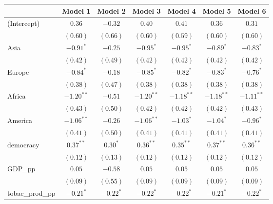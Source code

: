 
\begin{table}[!h]
\begin{center}
\begin{tabular}{l c c c c c c }
\toprule
 & Model 1 & Model 2 & Model 3 & Model 4 & Model 5 & Model 6 \\
\midrule
(Intercept)             & $0.36$       & $-0.32$      & $0.40$       & $0.41$       & $0.36$       & $0.31$       \\
                        & $(0.60)$     & $(0.66)$     & $(0.60)$     & $(0.59)$     & $(0.60)$     & $(0.60)$     \\
Asia                    & $-0.91^{*}$  & $-0.25$      & $-0.95^{*}$  & $-0.95^{*}$  & $-0.89^{*}$  & $-0.83^{*}$  \\
                        & $(0.42)$     & $(0.49)$     & $(0.42)$     & $(0.42)$     & $(0.42)$     & $(0.42)$     \\
Europe                  & $-0.84^{*}$  & $-0.18$      & $-0.85^{*}$  & $-0.82^{*}$  & $-0.83^{*}$  & $-0.76^{*}$  \\
                        & $(0.38)$     & $(0.47)$     & $(0.38)$     & $(0.38)$     & $(0.38)$     & $(0.38)$     \\
Africa                  & $-1.20^{**}$ & $-0.51$      & $-1.20^{**}$ & $-1.18^{**}$ & $-1.18^{**}$ & $-1.11^{**}$ \\
                        & $(0.43)$     & $(0.50)$     & $(0.42)$     & $(0.42)$     & $(0.42)$     & $(0.43)$     \\
America                 & $-1.06^{**}$ & $-0.26$      & $-1.06^{**}$ & $-1.03^{*}$  & $-1.04^{*}$  & $-0.96^{*}$  \\
                        & $(0.41)$     & $(0.50)$     & $(0.41)$     & $(0.41)$     & $(0.41)$     & $(0.41)$     \\
democracy               & $0.37^{**}$  & $0.30^{*}$   & $0.36^{**}$  & $0.35^{**}$  & $0.37^{**}$  & $0.36^{**}$  \\
                        & $(0.12)$     & $(0.13)$     & $(0.12)$     & $(0.12)$     & $(0.12)$     & $(0.12)$     \\
GDP\_pp                 & $0.05$       & $-0.58$      & $0.05$       & $0.05$       & $0.05$       & $0.05$       \\
                        & $(0.09)$     & $(0.55)$     & $(0.09)$     & $(0.09)$     & $(0.09)$     & $(0.09)$     \\
tobac\_prod\_pp         & $-0.21^{*}$  & $-0.22^{*}$  & $-0.22^{*}$  & $-0.22^{*}$  & $-0.21^{*}$  & $-0.22^{*}$  \\

\end{tabular}
\end{center}
\end{table}
